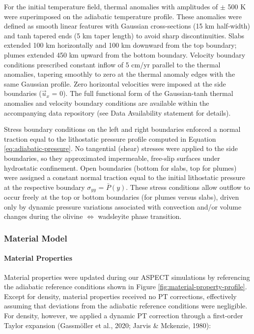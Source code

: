 \documentclass[draft,linenumbers]{agujournal2019}
\begin{document}
For the initial temperature field, thermal anomalies with amplitudes of
\(\pm\) 500 K were superimposed on the adiabatic temperature profile.
These anomalies were defined as smooth linear features with Gaussian
cross-sections (15 km half-width) and tanh tapered ends (5 km taper
length) to avoid sharp discontinuities. Slabs extended 100 km
horizontally and 100 km downward from the top boundary; plumes extended
450 km upward from the bottom boundary. Velocity boundary conditions
prescribed constant inflow of 5 cm/yr parallel to the thermal anomalies,
tapering smoothly to zero at the thermal anomaly edges with the same
Gaussian profile. Zero horizontal velocities were imposed at the side
boundaries (\(\vec{u}_x\) = 0). The full functional form of the
Gaussian-tanh thermal anomalies and velocity boundary conditions are
available within the accompanying data repository (see Data Availability
statement for details).

Stress boundary conditions on the left and right boundaries enforced a
normal traction equal to the lithostatic pressure profile computed in
Equation \ref{eq:adiabatic-pressure}. No tangential (shear) stresses
were applied to the side boundaries, so they approximated impermeable,
free-slip surfaces under hydrostatic confinement. Open boundaries
(bottom for slabs, top for plumes) were assigned a constant normal
traction equal to the initial lithostatic pressure at the respective
boundary \(\sigma_{yy}\) = \(\bar{P}(y)\). These stress conditions allow
outflow to occur freely at the top or bottom boundaries (for plumes
versus slabs), driven only by dynamic pressure variations associated
with convection and/or volume changes during the olivine
\(\Leftrightarrow\) wadsleyite phase transition.

\subsubsection{Material Model}\label{sec:material-model}

\paragraph{Material Properties}\label{sec:material-properties}

Material properties were updated during our ASPECT simulations by
referencing the adiabatic reference conditions shown in Figure
\ref{fig:material-property-profile}. Except for density, material
properties received no PT corrections, effectively assuming that
deviations from the adiabatic reference conditions were negligible. For
density, however, we applied a dynamic PT correction through a
first-order Taylor expansion (Gassmöller et al., 2020; Jarvis \&
Mckenzie, 1980):
\end{document}
